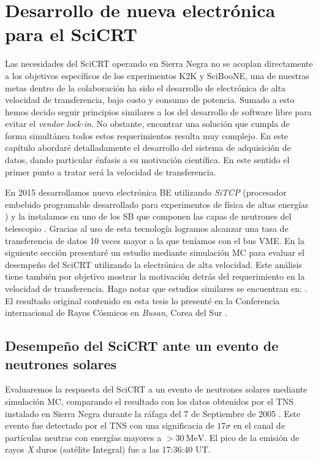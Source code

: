 
\chapter{Desarrollo de nueva electrónica para el SciCRT}
\label{chap:tres}

Las necesidades del SciCRT operando en Sierra Negra no se acoplan directamente a los objetivos específicos de los experimentos K2K y SciBooNE, una de nuestras metas dentro de la colaboración ha sido el desarrollo de electrónica de alta velocidad de transferencia, bajo costo y consumo de potencia. Sumado a esto hemos decido seguir principios similares a los del desarrollo de software libre para evitar el \emph{vendor lock-in}. No obstante, encontrar una solución que cumpla de forma simultánea todos estos requerimientos resulta muy complejo. En este capítulo abordaré detalladamente el desarrollo del sistema de adquisición de datos, dando particular énfasis a su motivación científica. En este sentido el primer punto a tratar será la velocidad de transferencia.

En \num{2015} desarrollamos nueva electrónica BE utilizando \emph{SiTCP} (procesador embebido programable desarrollado para experimentos de física de altas energías \cite{uchida08}) y la instalamos en uno de los SB que componen las capas de neutrones del telescopio \cite{ysasai17}. Gracias al uso de esta tecnología logramos alcanzar una tasa de transferencia de datos \num{10} veces mayor a la que teníamos con el bus VME. En la siguiente sección presentaré un estudio mediante simulación MC para evaluar el desempeño del SciCRT utilizando la electrónica de alta velocidad. Este análisis tiene también por objetivo mostrar la motivación detrás del requerimiento en la velocidad de transferencia. Hago notar que estudios similares se encuentran en: \cite{ynagai14,ysasai17}. El resultado original contenido en esta tesis lo presenté en la Conferencia internacional de Rayos Cósmicos en \emph{Busan}, Corea del Sur \cite{manzorena171}.

\section{Desempeño del SciCRT ante un evento de neutrones solares}

Evaluaremos la respuesta del SciCRT a un evento de neutrones solares mediante simulación MC, comparando el resultado con los datos obtenidos por el TNS instalado en Sierra Negra durante la ráfaga del \num{7} de Septiembre de \num{2005} \cite{sako06}. Este evento fue detectado por el TNS con una significacia de $17\sigma$ en el canal de partículas neutras con energías mayores a $>\SI{30}{\mega\electronvolt}$. El pico de la emisión de rayos \emph{X} duros (satélite Integral) fue a las 17:36:40 UT.

